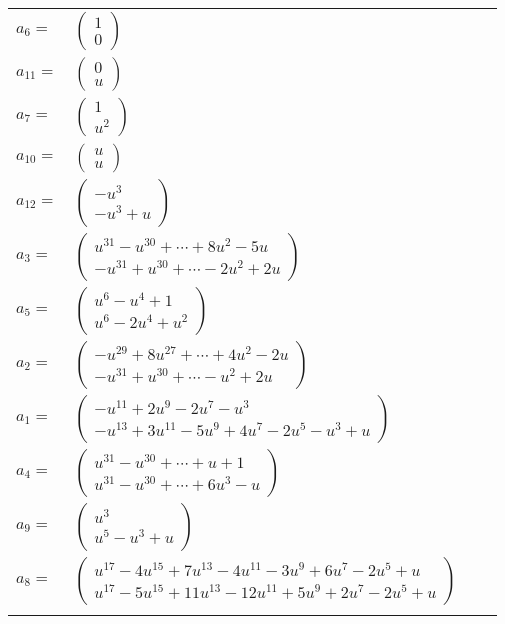 \documentclass[1p]{elsarticle_modified}
\theoremstyle{definition}
\begin{document}
\begin{tabular}{m{7pt} m{180pt} m{7pt} m{180pt} }
\flushright $a_{6}=$&$\begin{pmatrix}1\\0\end{pmatrix}$ \\
\flushright $a_{11}=$&$\begin{pmatrix}0\\u\end{pmatrix}$ \\
\flushright $a_{7}=$&$\begin{pmatrix}1\\u^2\end{pmatrix}$ \\
\flushright $a_{10}=$&$\begin{pmatrix}u\\u\end{pmatrix}$ \\
\flushright $a_{12}=$&$\begin{pmatrix}- u^3\\- u^3+u\end{pmatrix}$ \\
\flushright $a_{3}=$&$\begin{pmatrix}u^{31}- u^{30}+\cdots+8 u^2-5 u\\- u^{31}+u^{30}+\cdots-2 u^2+2 u\end{pmatrix}$ \\
\flushright $a_{5}=$&$\begin{pmatrix}u^6- u^4+1\\u^6-2 u^4+u^2\end{pmatrix}$ \\
\flushright $a_{2}=$&$\begin{pmatrix}- u^{29}+8 u^{27}+\cdots+4 u^2-2 u\\- u^{31}+u^{30}+\cdots- u^2+2 u\end{pmatrix}$ \\
\flushright $a_{1}=$&$\begin{pmatrix}- u^{11}+2 u^9-2 u^7- u^3\\- u^{13}+3 u^{11}-5 u^9+4 u^7-2 u^5- u^3+u\end{pmatrix}$ \\
\flushright $a_{4}=$&$\begin{pmatrix}u^{31}- u^{30}+\cdots+u+1\\u^{31}- u^{30}+\cdots+6 u^3- u\end{pmatrix}$ \\
\flushright $a_{9}=$&$\begin{pmatrix}u^3\\u^5- u^3+u\end{pmatrix}$ \\
\flushright $a_{8}=$&$\begin{pmatrix}u^{17}-4 u^{15}+7 u^{13}-4 u^{11}-3 u^9+6 u^7-2 u^5+u\\u^{17}-5 u^{15}+11 u^{13}-12 u^{11}+5 u^9+2 u^7-2 u^5+u\end{pmatrix}$\\&\end{tabular}
\end{document}
